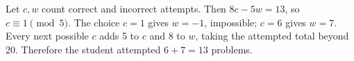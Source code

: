 Let $c,w$ count correct and incorrect attempts. Then $8c-5w=13$, so $c\equiv1\pmod5$. The choice $c=1$ gives $w=-1$, impossible; $c=6$ gives $w=7$. Every next possible $c$ adds 5 to $c$ and 8 to $w$, taking the attempted total beyond 20. Therefore the student attempted $6+7=\boxed{13}$ problems.
